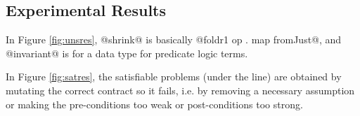 \subsection{Experimental Results}



In Figure \ref{fig:unsres}, @shrink@ is basically
@foldr1 op . map fromJust@, and @invariant@ is for a data type
for predicate logic terms.

In Figure \ref{fig:satres}, the satisfiable problems (under the line) are
obtained by mutating the correct contract so it fails, i.e.  by
removing a necessary assumption or making the pre-conditions too weak
or post-conditions too strong.


